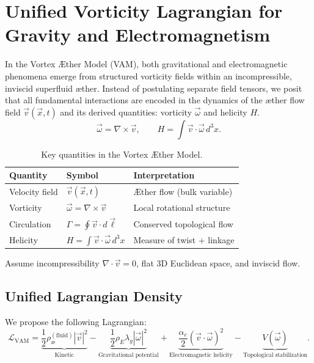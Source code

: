 \section{Unified Vorticity Lagrangian for Gravity and Electromagnetism}

In the Vortex \AE{}ther Model (VAM), both gravitational and electromagnetic phenomena emerge from structured vorticity fields within an incompressible, inviscid superfluid \ae{}ther. Instead of postulating separate field tensors, we posit that all fundamental interactions are encoded in the dynamics of the \ae{}ther flow field $\vec{v}(\vec{x}, t)$ and its derived quantities: vorticity $\vec{\omega}$ and helicity $H$.
\[
\vec{\omega} = \nabla \times \vec{v}, \qquad H = \int \vec{v} \cdot \vec{\omega} \, d^3x.
\]
\begin{table}[H]
\centering
\begin{tabular}{|l|l|l|}
\hline
\textbf{Quantity} & \textbf{Symbol} & \textbf{Interpretation} \\
\hline
Velocity field & $\vec{v}(\vec{x}, t)$ & Æther flow (bulk variable) \\
Vorticity & $\vec{\omega} = \nabla \times \vec{v}$ & Local rotational structure \\
Circulation & $\Gamma = \oint \vec{v} \cdot d\vec{\ell}$ & Conserved topological flow \\
Helicity & $H = \int \vec{v} \cdot \vec{\omega} \, d^3x$ & Measure of twist + linkage \\
\hline
\end{tabular}
\caption{Key quantities in the Vortex Æther Model.}
\end{table}

Assume incompressibility \( \nabla \cdot \vec{v} = 0 \), flat 3D Euclidean space, and inviscid flow.

\subsection{Unified Lagrangian Density}

We propose the following Lagrangian:
\begin{equation}
\mathcal{L}_{\text{VAM}} =
\underbrace{\frac{1}{2} \rho_\text{\ae}^{(\text{fluid})} |\vec{v}|^2}_{\text{Kinetic}}
- \underbrace{\frac{1}{2} \rho_{\scriptscriptstyle\boldsymbol\!E}\lambda_g |\vec{\omega}|^2}_{\text{Gravitational potential}}
+ \underbrace{\frac{\alpha_e}{2} (\vec{v} \cdot \vec{\omega})^2}_{\text{Electromagnetic helicity}}
- \underbrace{V(\vec{\omega})}_{\text{Topological stabilization}}.
\end{equation}

